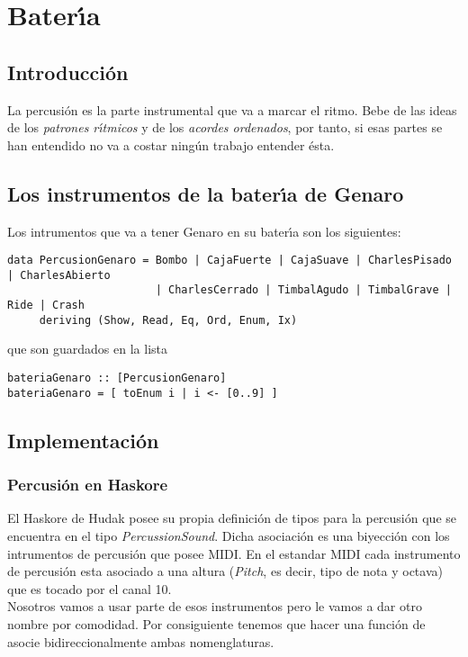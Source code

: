 \chapter{Bater\'\i a}

\section{Introducci\'on}
La percusi\'on es la parte instrumental que va a marcar el ritmo. Bebe de las ideas
de los \emph{patrones r\'\i tmicos} y de los \emph{acordes ordenados}, por tanto, si esas partes
se han entendido no va a costar ning\'un trabajo entender \'esta.

\section{Los instrumentos de la bater\'\i a de Genaro}
Los intrumentos que va a tener Genaro en su bater\'\i a son los siguientes:
\small
\begin{verbatim}
data PercusionGenaro = Bombo | CajaFuerte | CajaSuave | CharlesPisado | CharlesAbierto
                       | CharlesCerrado | TimbalAgudo | TimbalGrave | Ride | Crash
     deriving (Show, Read, Eq, Ord, Enum, Ix)
\end{verbatim}
\normalsize
que son guardados en la lista
\small
\begin{verbatim}
bateriaGenaro :: [PercusionGenaro]
bateriaGenaro = [ toEnum i | i <- [0..9] ]
\end{verbatim}
\normalsize

\section{Implementaci\'on}

\subsection{Percusi\'on en Haskore}
El Haskore de Hudak posee su propia definici\'on de tipos para la percusi\'on que
se encuentra en el tipo \emph{PercussionSound}. Dicha asociaci\'on es una biyecci\'on
con los intrumentos de percusi\'on que posee MIDI. En el estandar MIDI cada
instrumento de percusi\'on esta asociado a una altura (\emph{Pitch}, es decir, tipo de nota y octava)
que es tocado por el canal 10.\\
\indent Nosotros vamos a usar parte de esos instrumentos pero le vamos a dar otro nombre por
comodidad. Por consiguiente tenemos que hacer una funci\'on de asocie bidireccionalmente
ambas nomenglaturas.

